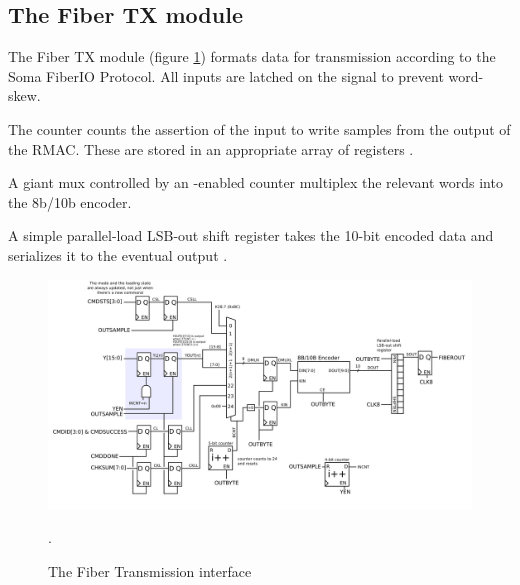 \subsection{The Fiber TX module} 

The Fiber TX module (figure \ref{fibertx})  formats data for transmission according to the
Soma FiberIO Protocol. All inputs are latched on the
 signal to prevent word-skew.

The counter  counts the assertion of the input
 to write samples from the output of the RMAC. These are stored in an appropriate array of registers .

A giant mux controlled by an -enabled counter multiplex the relevant words into the 8b/10b encoder. 

A simple parallel-load LSB-out shift register takes the 10-bit encoded
data  and serializes it to the eventual output
.


\begin{figure}[h!]
\includegraphics[scale=0.7]{fiberTX.svg}
\label{fibertx}
\caption{The Fiber Transmission interface}. 
\end{figure}
